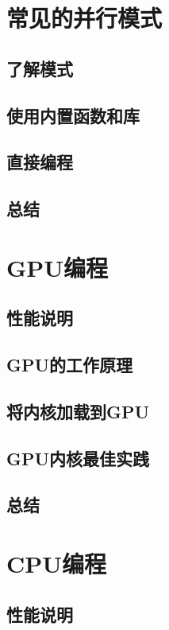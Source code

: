 \documentclass[11pt,a4paper,UTF8]{ctexart}
\begin{document}
	\section{常见的并行模式}
	
		\subsection{了解模式}
		
		\subsection{使用内置函数和库}
		
		\subsection{直接编程}
		
		\subsection{总结}
		
	\section{GPU编程}
		\subsection{性能说明}
		\subsection{GPU的工作原理}
		\subsection{将内核加载到GPU}
		\subsection{GPU内核最佳实践}
		\subsection{总结}
	\section{CPU编程}
		\subsection{性能说明}
\end{document}
